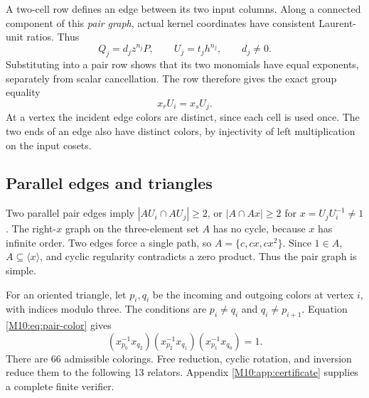 \documentclass[11pt,a4paper,oneside]{report}
\theoremstyle{definition}
\theoremstyle{remark}
\begin{document}
A two-cell row defines an edge between its two input columns.
Along a connected component of this \emph{pair graph}, actual kernel
coordinates have consistent Laurent-unit ratios. Thus
\[
Q_j=d_jz^{n_j}P,\qquad U_j=t_jh^{n_j},\qquad d_j\ne0.
\]
Substituting into a pair row shows that its two monomials have
equal exponents, separately from scalar cancellation. The row
therefore gives the exact group equality
\begin{equation}\label{M10:eq:pair-color}
x_rU_i=x_sU_j.
\end{equation}
At a vertex the incident edge colors are distinct, since each cell
is used once. The two ends of an edge also have distinct colors,
by injectivity of left multiplication on the input cosets.

\subsection{Parallel edges and triangles}
Two parallel pair edges imply $|AU_i\cap AU_j|\ge2$, or
$|A\cap Ax|\ge2$ for $x=U_jU_i^{-1}\ne1$.
The right-$x$ graph on the three-element set $A$ has no cycle,
because $x$ has infinite order. Two edges force a single path,
so $A=\{c,cx,cx^2\}$. Since $1\in A$, $A\subseteq\langle x\rangle$,
and cyclic regularity contradicts a zero product. Thus the pair
graph is simple.

For an oriented triangle, let $p_i,q_i$ be the incoming and
outgoing colors at vertex $i$, with indices modulo three. The
conditions are $p_i\ne q_i$ and $q_i\ne p_{i+1}$. Equation
\eqref{M10:eq:pair-color} gives
\[
(x_{p_0}^{-1}x_{q_2})
(x_{p_2}^{-1}x_{q_1})
(x_{p_1}^{-1}x_{q_0})=1.
\]
There are 66 admissible colorings. Free reduction, cyclic rotation,
and inversion reduce them to the following 13 relators. Appendix
\ref{M10:app:certificate} supplies a complete finite verifier.
\end{document}
